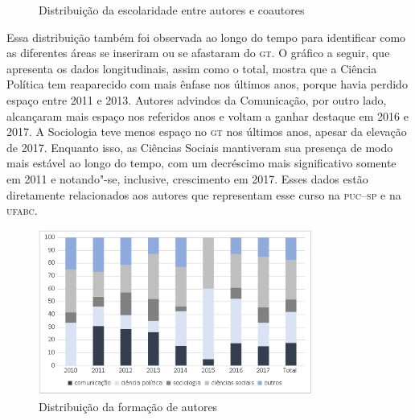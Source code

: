 \begin{figure}[!ht]

\caption{Distribuição da escolaridade entre autores e coautores\footnotemark}
\end{figure}


Essa distribuição também foi observada ao longo do tempo para
identificar como as diferentes áreas se inseriram ou se afastaram do \textsc{gt}.
O gráfico a seguir, que apresenta os dados longitudinais, assim como o
total, mostra que a Ciência Política tem reaparecido com mais ênfase nos
últimos anos, porque havia perdido espaço entre 2011 e 2013. Autores
advindos da Comunicação, por outro lado, alcançaram mais espaço nos
referidos anos e voltam a ganhar destaque em 2016 e 2017. A Sociologia
teve menos espaço no \textsc{gt} nos últimos anos, apesar da elevação de 2017.
Enquanto isso, as Ciências Sociais mantiveram sua presença de modo mais
estável ao longo do tempo, com um decréscimo mais significativo somente
em 2011 e notando"-se, inclusive, crescimento em 2017. Esses dados estão
diretamente relacionados aos autores que representam esse curso na
\textsc{puc--sp} e na \textsc{ufabc}.


\pagebreak
 \begin{figure}[!ht]
 \centering
  \includegraphics[width=90mm]{./imgs/graf3_4.png}
 \caption{Distribuição da formação de autores\footnotemark}
 \end{figure}

